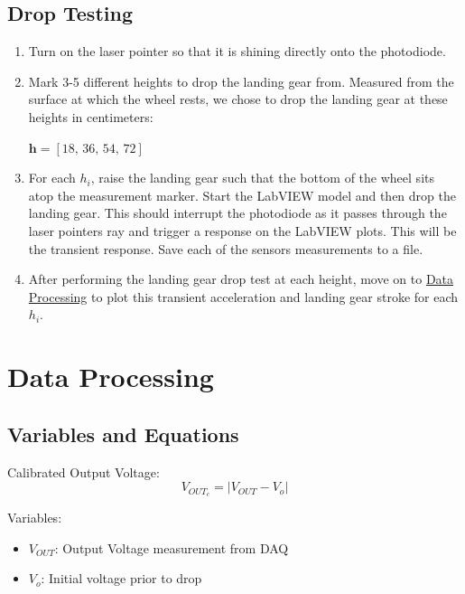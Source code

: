 \documentclass{article}
\begin{document}
\subsection{Drop Testing}
\begin{enumerate}
    \item Turn on the laser pointer so that it is shining directly onto the photodiode.
    \item Mark 3-5 different heights to drop the landing gear from. Measured from the surface at which the wheel rests, we chose to drop the landing gear at these heights in centimeters:
    \begin{center}
            \(\textbf{h} = \left[18,\, 36,\, 54,\, 72\right]\)
    \end{center}
    \item For each $h_{i}$, raise the landing gear such that the bottom of the wheel sits atop the measurement marker. Start the LabVIEW model and then drop the landing gear. This should interrupt the photodiode as it passes through the laser pointers ray and trigger a response on the LabVIEW plots. This will be the transient response. Save each of the sensors measurements to a file.
    \item After performing the landing gear drop test at each height, move on to \hyperlink{datapro}{Data Processing} to plot this transient acceleration and landing gear stroke for each $h_{i}$.
    \end{enumerate}

\hypertarget{datapro}{}
\section{Data Processing}
\subsection{Variables and Equations}  

Calibrated Output Voltage:
\begin{equation}
    V_{OUT_c} = |V_{OUT} - V_{o}|
\end{equation}

Variables:
\begin{itemize}
    \item \(V_{OUT}\): Output Voltage measurement from DAQ
    \item \(V_{o}\): Initial voltage prior to drop
\end{itemize}
\vspace{5mm}
\end{document}
